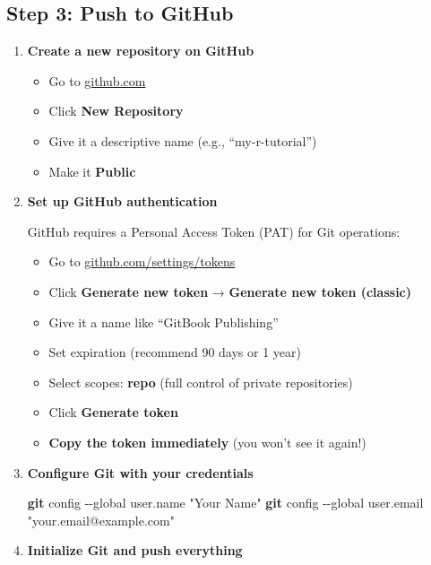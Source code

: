 \documentclass[
]{book}
\newenvironment{Shaded}{\begin{snugshade}}{\end{snugshade}}
\newcommand{\AttributeTok}[1]{\textcolor[rgb]{0.13,0.29,0.53}{#1}}
\newcommand{\FunctionTok}[1]{\textcolor[rgb]{0.13,0.29,0.53}{\textbf{#1}}}
\newcommand{\NormalTok}[1]{#1}
\newcommand{\StringTok}[1]{\textcolor[rgb]{0.31,0.60,0.02}{#1}}
\providecommand{\tightlist}{%
  \setlength{\itemsep}{0pt}\setlength{\parskip}{0pt}}
\begin{document}
\subsection{Step 3: Push to GitHub}\label{step-3-push-to-github}

\begin{enumerate}
\def\labelenumi{\arabic{enumi}.}
\item
  \textbf{Create a new repository on GitHub}

  \begin{itemize}
  \tightlist
  \item
    Go to \href{https://github.com}{github.com}
  \item
    Click \textbf{New Repository}
  \item
    Give it a descriptive name (e.g., ``my-r-tutorial'')
  \item
    Make it \textbf{Public}
  \end{itemize}
\item
  \textbf{Set up GitHub authentication}

  GitHub requires a Personal Access Token (PAT) for Git operations:

  \begin{itemize}
  \tightlist
  \item
    Go to \href{https://github.com/settings/tokens}{github.com/settings/tokens}
  \item
    Click \textbf{Generate new token} → \textbf{Generate new token (classic)}
  \item
    Give it a name like ``GitBook Publishing''
  \item
    Set expiration (recommend 90 days or 1 year)
  \item
    Select scopes: \textbf{repo} (full control of private repositories)
  \item
    Click \textbf{Generate token}
  \item
    \textbf{Copy the token immediately} (you won't see it again!)
  \end{itemize}
\item
  \textbf{Configure Git with your credentials}

\begin{Shaded}
\begin{Highlighting}[]
\FunctionTok{git}\NormalTok{ config }\AttributeTok{{-}{-}global}\NormalTok{ user.name }\StringTok{"Your Name"}
\FunctionTok{git}\NormalTok{ config }\AttributeTok{{-}{-}global}\NormalTok{ user.email }\StringTok{"your.email@example.com"}
\end{Highlighting}
\end{Shaded}
\item
  \textbf{Initialize Git and push everything}


\end{enumerate}
\end{document}
